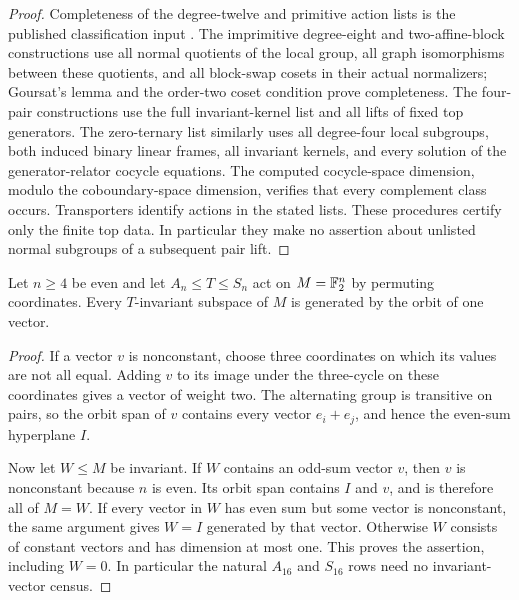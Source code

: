 \begin{proof}
Completeness of the degree-twelve and primitive action lists is the
published classification input
\cite{Hulpke2005,HoltRoyle2020,RoneyDougal2005Primitive,TransGrp365,PrimGrp344}.
The imprimitive degree-eight and two-affine-block constructions use
all normal quotients of the local group, all graph isomorphisms between
these quotients, and all block-swap cosets in their actual normalizers;
Goursat's lemma and the order-two coset condition prove completeness.
The four-pair constructions use the full invariant-kernel list and all
lifts of fixed top generators. The zero-ternary list similarly uses
all degree-four local subgroups, both induced binary linear frames,
all invariant kernels, and every solution of the generator-relator
cocycle equations. The computed cocycle-space dimension, modulo the
coboundary-space dimension, verifies that every complement class occurs.
Transporters identify actions in the stated lists. These procedures
certify only the finite top data. In particular they make no assertion
about unlisted normal subgroups of a subsequent pair lift.
\end{proof}

\begin{lemma}\label{lem:natural-binary-cyclic}
Let $n\geq4$ be even and let $A_n\leq T\leq S_n$ act on
$M=\mathbb F_2^n$ by permuting coordinates. Every $T$-invariant subspace
of $M$ is generated by the orbit of one vector.
\end{lemma}
\begin{proof}
If a vector $v$ is nonconstant, choose three coordinates on which
its values are not all equal. Adding $v$ to its image under the
three-cycle on these coordinates gives a vector of weight two.
The alternating group is transitive on pairs, so the orbit span
of $v$ contains every vector $e_i+e_j$, and hence the even-sum
hyperplane $I$.

Now let $W\leq M$ be invariant. If $W$ contains an odd-sum vector
$v$, then $v$ is nonconstant because $n$ is even. Its orbit span
contains $I$ and $v$, and is therefore all of $M=W$. If every
vector in $W$ has even sum but some vector is nonconstant, the
same argument gives $W=I$ generated by that vector. Otherwise
$W$ consists of constant vectors and has dimension at most one.
This proves the assertion, including $W=0$. In particular the
natural $A_{16}$ and $S_{16}$ rows need no invariant-vector census.
\end{proof}

